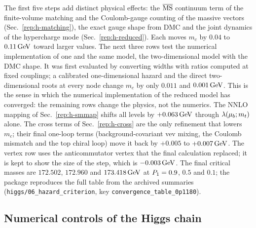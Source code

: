 The first five steps add distinct physical effects: the $\overline{\mathrm{MS}}$ continuum term of the finite-volume matching and the Coulomb-gauge counting of the massive vectors (Sec.~\ref{rep:h-matching}), the exact gauge shape from DMC and the joint dynamics of the hypercharge mode (Sec.~\ref{rep:h-reduced}).
Each moves $m_c$ by $0.04$ to $0.11\,\mathrm{GeV}$ toward larger values. %
The next three rows test the numerical implementation of one and the same model, the two-dimensional model with the DMC shape.
It was first evaluated by converting widths with ratios computed at fixed couplings; a calibrated one-dimensional hazard and the direct two-dimensional roots at every node change $m_c$ by only $0.011$ and $0.001\,\mathrm{GeV}$. %
This is the sense in which the numerical implementation of the reduced model has converged: the remaining rows change the physics, not the numerics.
The NNLO mapping of Sec.~\ref{rep:h-smmap} shifts all levels by $+0.063\,\mathrm{GeV}$ through $\lambda(\mu_b;m_t)$ alone. %
The cross terms of Sec.~\ref{rep:h-cross} are the only refinement that lowers $m_c$; their final one-loop terms (background-covariant vev mixing, the Coulomb mismatch and the top chiral loop) move it back by $+0.005$ to $+0.007\,\mathrm{GeV}$. %
The vertex row uses the anticommutator vertex that the final calculation replaced; it is kept to show the size of the step, which is $-0.003\,\mathrm{GeV}$. %
The final critical masses are $172.502$, $172.960$ and $173.418\,\mathrm{GeV}$ at $P_1=0.9$, $0.5$ and $0.1$; the package reproduces the full table from the archived summaries (\texttt{higgs/06\_hazard\_criterion}, key \texttt{convergence\_table\_0p1180}). %

\subsection{Numerical controls of the Higgs chain}\label{sec:v20-higgs}

